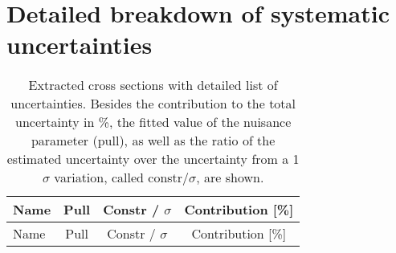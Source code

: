 \chapter{Detailed breakdown of systematic uncertainties} 
\label{app:uncert}

\begin{longtable}{ l | c | c | c }%
\caption{Extracted cross sections with detailed
  list of uncertainties. Besides the contribution to the total
  uncertainty in \%, the fitted value of the nuisance parameter (pull), as well as the ratio of the estimated
  uncertainty over the uncertainty from a 1 $\sigma$ variation, called
  constr/$\sigma$, are shown. 
  \label{tab:lh_res_eightfull}}\\
\hline
Name & Pull & Constr / $\sigma$ & Contribution [\%] \\ 
\hline
\endfirsthead
\hline
Name & Pull & Constr / $\sigma$ & Contribution [\%] \\ 
\hline
\endhead

\end{longtable}